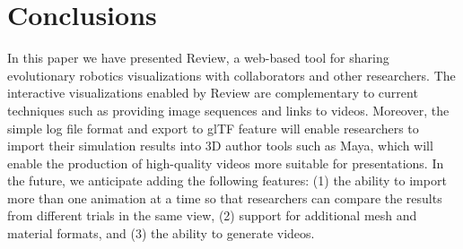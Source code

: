 \section{Conclusions}
\label{sec:conclusions}

In this paper we have presented Review, a web-based tool for sharing evolutionary robotics visualizations with collaborators and other researchers.
%
The interactive visualizations enabled by Review are complementary to current techniques such as providing image sequences and links to videos.
%
Moreover, the simple log file format and export to glTF feature will enable researchers to import their simulation results into 3D author tools such as Maya, which will enable the production of high-quality videos more suitable for presentations.
%
In the future, we anticipate adding the following features: (1) the ability to import more than one animation at a time so that researchers can compare the results from different trials in the same view, (2) support for additional mesh and material formats, and (3) the ability to generate videos.
